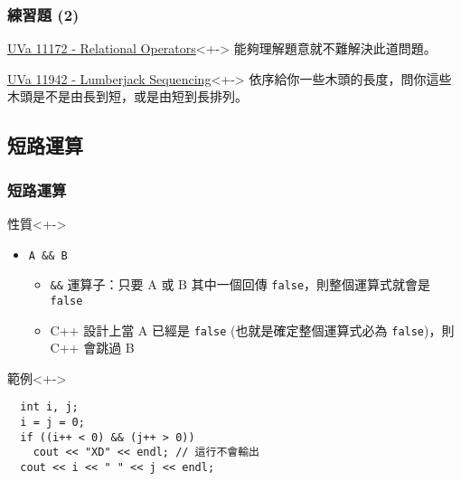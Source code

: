 \documentclass[utf8]{beamer}
\begin{document}
\begin{CJK}{UTF8}{bkai}
\begin{frame}
  \frametitle{練習題 (2)}
  \begin{exampleblock}{\href{http://unfortunate-dog.github.io/articles/111/p11172/}{UVa 11172 - Relational Operators}}<+->
  \label{uva:11172}
  能夠理解題意就不難解決此道問題。
  \end{exampleblock}
  \begin{exampleblock}{\href{http://unfortunate-dog.github.io/articles/119/p11942/}{UVa 11942 - Lumberjack Sequencing}}<+->
  \label{uva:11942}
  依序給你一些木頭的長度，問你這些木頭是不是由長到短，或是由短到長排列。
  \end{exampleblock}
\end{frame}

\subsection{短路運算}

\begin{frame}[fragile]
  \frametitle{短路運算}
  \begin{block}{性質}<+->
    \begin{itemize}
    \item \lstinline{A && B}{}
      \begin{itemize}[<+->]
      \item \lstinline{&&}{} 運算子：只要 A 或 B 其中一個回傳 \lstinline{false}{}，則整個運算式就會是 \lstinline{false}{}
      \item C++ 設計上當 A 已經是 \lstinline{false}{} (也就是確定整個運算式\alert{必為} \lstinline{false}{})，則 C++ 會\alert{跳過} B
      \end{itemize}
    \end{itemize}
  \end{block}
  \begin{exampleblock}{範例}<+->
    \begin{lstlisting}
  int i, j;
  i = j = 0;
  if ((i++ < 0) && (j++ > 0))
    cout << "XD" << endl; // 這行不會輸出
  cout << i << " " << j << endl;
    \end{lstlisting}
  \end{exampleblock}
\end{frame}


\end{CJK}
\end{document}

